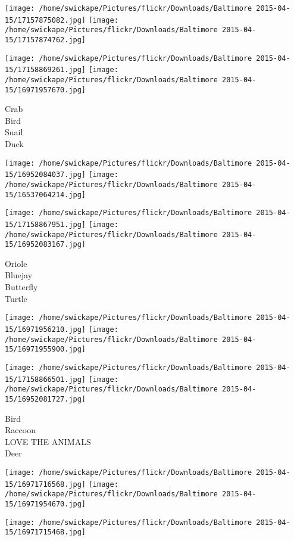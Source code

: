\documentclass[10pt,letterpaper]{article}
\begin{document}
\texttt{[image: /home/swickape/Pictures/flickr/Downloads/Baltimore 2015-04-15/17157875082.jpg]}
\texttt{[image: /home/swickape/Pictures/flickr/Downloads/Baltimore 2015-04-15/17157874762.jpg]}

\texttt{[image: /home/swickape/Pictures/flickr/Downloads/Baltimore 2015-04-15/17158869261.jpg]}
\texttt{[image: /home/swickape/Pictures/flickr/Downloads/Baltimore 2015-04-15/16971957670.jpg]}

Crab\\
Bird\\
Snail\\
Duck
\pagebreak

\texttt{[image: /home/swickape/Pictures/flickr/Downloads/Baltimore 2015-04-15/16952084037.jpg]}
\texttt{[image: /home/swickape/Pictures/flickr/Downloads/Baltimore 2015-04-15/16537064214.jpg]}

\texttt{[image: /home/swickape/Pictures/flickr/Downloads/Baltimore 2015-04-15/17158867951.jpg]}
\texttt{[image: /home/swickape/Pictures/flickr/Downloads/Baltimore 2015-04-15/16952083167.jpg]}

Oriole\\
Bluejay\\
Butterfly\\
Turtle
\pagebreak

\texttt{[image: /home/swickape/Pictures/flickr/Downloads/Baltimore 2015-04-15/16971956210.jpg]}
\texttt{[image: /home/swickape/Pictures/flickr/Downloads/Baltimore 2015-04-15/16971955900.jpg]}

\texttt{[image: /home/swickape/Pictures/flickr/Downloads/Baltimore 2015-04-15/17158866501.jpg]}
\texttt{[image: /home/swickape/Pictures/flickr/Downloads/Baltimore 2015-04-15/16952081727.jpg]}

Bird\\
Raccoon\\
LOVE THE ANIMALS\\
Deer
\pagebreak

\texttt{[image: /home/swickape/Pictures/flickr/Downloads/Baltimore 2015-04-15/16971716568.jpg]}
\texttt{[image: /home/swickape/Pictures/flickr/Downloads/Baltimore 2015-04-15/16971954670.jpg]}

\vspace{0.25in}
\texttt{[image: /home/swickape/Pictures/flickr/Downloads/Baltimore 2015-04-15/16971715468.jpg]}
\end{document}
